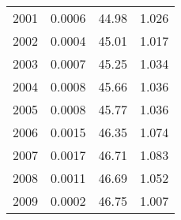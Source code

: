 \begin{tabular}{cccc}
  2001 & 0.0006 & 44.98 & 1.026 \\ 
  2002 & 0.0004 & 45.01 & 1.017 \\ 
  2003 & 0.0007 & 45.25 & 1.034 \\ 
  2004 & 0.0008 & 45.66 & 1.036 \\ 
  2005 & 0.0008 & 45.77 & 1.036 \\ 
  2006 & 0.0015 & 46.35 & 1.074 \\ 
  2007 & 0.0017 & 46.71 & 1.083 \\ 
  2008 & 0.0011 & 46.69 & 1.052 \\ 
  2009 & 0.0002 & 46.75 & 1.007 \\ 
   \hline
\end{tabular}
